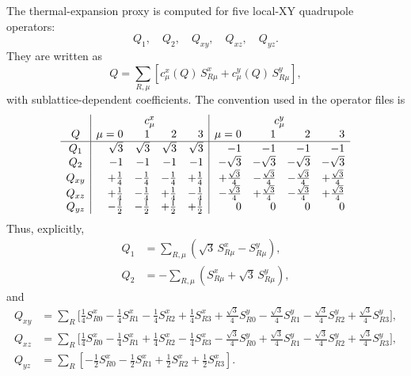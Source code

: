 \documentclass[11pt]{article}
\begin{document}
The thermal-expansion proxy is computed for five local-XY quadrupole
operators:
\begin{equation}
  Q_1,\quad Q_2,\quad Q_{xy},\quad Q_{xz},\quad Q_{yz}.
\end{equation}
They are written as
\begin{equation}
  Q = \sum_{R,\mu}
  \left[
    c^x_{\mu}(Q)\,S^x_{R\mu}
    +
    c^y_{\mu}(Q)\,S^y_{R\mu}
  \right],
  \label{eq:q-general}
\end{equation}
with sublattice-dependent coefficients.  The convention used in the operator
files is
\begin{equation}
\begin{array}{c|rrrr|rrrr}
  & \multicolumn{4}{c|}{c^x_\mu}
  & \multicolumn{4}{c}{c^y_\mu} \\
  Q & \mu=0 & 1 & 2 & 3 & \mu=0 & 1 & 2 & 3 \\ \hline
  Q_1
    & \sqrt3 & \sqrt3 & \sqrt3 & \sqrt3
    & -1 & -1 & -1 & -1 \\
  Q_2
    & -1 & -1 & -1 & -1
    & -\sqrt3 & -\sqrt3 & -\sqrt3 & -\sqrt3 \\
  Q_{xy}
    & +\frac14 & -\frac14 & -\frac14 & +\frac14
    & +\frac{\sqrt3}{4} & -\frac{\sqrt3}{4}
    & -\frac{\sqrt3}{4} & +\frac{\sqrt3}{4} \\
  Q_{xz}
    & +\frac14 & -\frac14 & +\frac14 & -\frac14
    & -\frac{\sqrt3}{4} & +\frac{\sqrt3}{4}
    & -\frac{\sqrt3}{4} & +\frac{\sqrt3}{4} \\
  Q_{yz}
    & -\frac12 & -\frac12 & +\frac12 & +\frac12
    & 0 & 0 & 0 & 0
\end{array}
\label{eq:q-coeff-table}
\end{equation}
Thus, explicitly,
\begin{equation}
\begin{aligned}
  Q_1
  &= \sum_{R,\mu}
     \left(\sqrt3\,S^x_{R\mu}-S^y_{R\mu}\right),\\
  Q_2
  &= -\sum_{R,\mu}
     \left(S^x_{R\mu}+\sqrt3\,S^y_{R\mu}\right),
\end{aligned}
\label{eq:eg-explicit}
\end{equation}
and
\begin{equation}
\begin{aligned}
  Q_{xy}
  &= \sum_R \biggl[
      \frac14 S^x_{R0}-\frac14 S^x_{R1}
      -\frac14 S^x_{R2}+\frac14 S^x_{R3}
      +\frac{\sqrt3}{4} S^y_{R0}
      -\frac{\sqrt3}{4} S^y_{R1}
      -\frac{\sqrt3}{4} S^y_{R2}
      +\frac{\sqrt3}{4} S^y_{R3}
     \biggr],\\
  Q_{xz}
  &= \sum_R \biggl[
      \frac14 S^x_{R0}-\frac14 S^x_{R1}
      +\frac14 S^x_{R2}-\frac14 S^x_{R3}
      -\frac{\sqrt3}{4} S^y_{R0}
      +\frac{\sqrt3}{4} S^y_{R1}
      -\frac{\sqrt3}{4} S^y_{R2}
      +\frac{\sqrt3}{4} S^y_{R3}
     \biggr],\\
  Q_{yz}
  &= \sum_R \left[
      -\frac12 S^x_{R0}
      -\frac12 S^x_{R1}
      +\frac12 S^x_{R2}
      +\frac12 S^x_{R3}
     \right].
\end{aligned}
\label{eq:t2g-explicit}
\end{equation}
\end{document}
